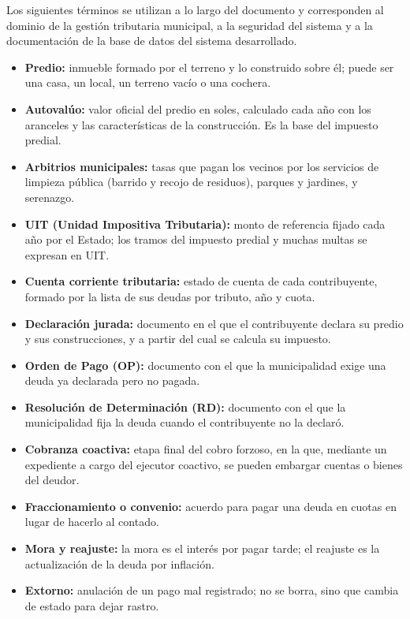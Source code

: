 \documentclass[12pt,a4paper]{report}
\begin{document}
Los siguientes términos se utilizan a lo largo del documento y corresponden al dominio de la gestión tributaria municipal, a la seguridad del sistema y a la documentación de la base de datos del sistema desarrollado.

\begin{itemize}[leftmargin=1.25cm,itemsep=0pt,topsep=0pt]
  \item \textbf{Predio:} inmueble formado por el terreno y lo construido sobre él; puede ser una casa, un local, un terreno vacío o una cochera.
  \item \textbf{Autovalúo:} valor oficial del predio en soles, calculado cada año con los aranceles y las características de la construcción. Es la base del impuesto predial.
  \item \textbf{Arbitrios municipales:} tasas que pagan los vecinos por los servicios de limpieza pública (barrido y recojo de residuos), parques y jardines, y serenazgo.
  \item \textbf{UIT (Unidad Impositiva Tributaria):} monto de referencia fijado cada año por el Estado; los tramos del impuesto predial y muchas multas se expresan en UIT.
  \item \textbf{Cuenta corriente tributaria:} estado de cuenta de cada contribuyente, formado por la lista de sus deudas por tributo, año y cuota.
  \item \textbf{Declaración jurada:} documento en el que el contribuyente declara su predio y sus construcciones, y a partir del cual se calcula su impuesto.
  \item \textbf{Orden de Pago (OP):} documento con el que la municipalidad exige una deuda ya declarada pero no pagada.
  \item \textbf{Resolución de Determinación (RD):} documento con el que la municipalidad fija la deuda cuando el contribuyente no la declaró.
  \item \textbf{Cobranza coactiva:} etapa final del cobro forzoso, en la que, mediante un expediente a cargo del ejecutor coactivo, se pueden embargar cuentas o bienes del deudor.
  \item \textbf{Fraccionamiento o convenio:} acuerdo para pagar una deuda en cuotas en lugar de hacerlo al contado.
  \item \textbf{Mora y reajuste:} la mora es el interés por pagar tarde; el reajuste es la actualización de la deuda por inflación.
  \item \textbf{Extorno:} anulación de un pago mal registrado; no se borra, sino que cambia de estado para dejar rastro.

\end{itemize}
\end{document}
